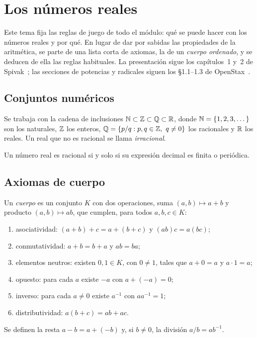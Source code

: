\chapter{Los números reales}
\label{tema:1}

Este tema fija las reglas de juego de todo el módulo: qué se puede hacer con los números reales y por qué. En lugar de dar por sabidas las propiedades de la aritmética, se parte de una lista corta de axiomas, la de un \emph{cuerpo ordenado}, y se deducen de ella las reglas habituales. La presentación sigue los capítulos~1 y~2 de Spivak~\cite{spivak}; las secciones de potencias y radicales siguen los §1.1--1.3 de OpenStax~\cite{openstax}.

\section{Conjuntos numéricos}

Se trabaja con la cadena de inclusiones $\mathbb{N}\subset\mathbb{Z}\subset\mathbb{Q}\subset\mathbb{R}$, donde $\mathbb{N}=\{1,2,3,\dots\}$ son los naturales, $\mathbb{Z}$ los enteros, $\mathbb{Q}=\{p/q: p,q\in\mathbb{Z},\ q\neq 0\}$ los racionales y $\mathbb{R}$ los reales. Un real que no es racional se llama \emph{irracional}.

\begin{proposicion}\label{prop:decimal-periodico}
Un número real es racional si y solo si su expresión decimal es finita o periódica.
\end{proposicion}

\addtocounter{definicion}{1}%

\section{Axiomas de cuerpo}

\begin{definicion}[Cuerpo]\label{def:cuerpo}
Un \emph{cuerpo} es un conjunto $K$ con dos operaciones, suma $(a,b)\mapsto a+b$ y producto $(a,b)\mapsto ab$, que cumplen, para todos $a,b,c\in K$:
\begin{enumerate}[label=(C\arabic*)]
  \item asociatividad: $(a+b)+c=a+(b+c)$ y $(ab)c=a(bc)$;
  \item conmutatividad: $a+b=b+a$ y $ab=ba$;
  \item elementos neutros: existen $0,1\in K$, con $0\neq 1$, tales que $a+0=a$ y $a\cdot 1=a$;
  \item opuesto: para cada $a$ existe $-a$ con $a+(-a)=0$;
  \item inverso: para cada $a\neq 0$ existe $a^{-1}$ con $aa^{-1}=1$;
  \item distributividad: $a(b+c)=ab+ac$.
\end{enumerate}
Se definen la resta $a-b=a+(-b)$ y, si $b\neq 0$, la división $a/b=ab^{-1}$.
\end{definicion}

